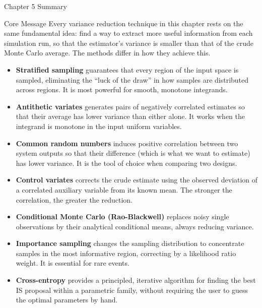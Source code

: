 \documentclass[aspectratio=169,10pt]{beamer}
\begin{document}
\begin{frame}[allowframebreaks]{Chapter 5 Summary}

\begin{block}{Core Message}
  Every variance reduction technique in this chapter rests on the same
  fundamental idea: find a way to extract more useful information from each
  simulation run, so that the estimator's variance is smaller than that of the
  crude Monte Carlo average.  The methods differ in how they achieve this.

  \begin{itemize}
    \item \textbf{Stratified sampling} guarantees that every region of the
          input space is sampled, eliminating the ``luck of the draw'' in how
          samples are distributed across regions.  It is most powerful for smooth,
          monotone integrands.
    \item \textbf{Antithetic variates} generates pairs of negatively correlated
          estimates so that their average has lower variance than either alone.
          It works when the integrand is monotone in the input uniform variables.
    \item \textbf{Common random numbers} induces positive correlation between two
          system outputs so that their difference (which is what we want to
          estimate) has lower variance.  It is the tool of choice when comparing
          two designs.
    \item \textbf{Control variates} corrects the crude estimate using the
          observed deviation of a correlated auxiliary variable from its known
          mean.  The stronger the correlation, the greater the reduction.
    \item \textbf{Conditional Monte Carlo (Rao-Blackwell)} replaces noisy single
          observations by their analytical conditional means, always reducing
          variance.
    \item \textbf{Importance sampling} changes the sampling distribution to
          concentrate samples in the most informative region, correcting by a
          likelihood ratio weight.  It is essential for rare events.
    \item \textbf{Cross-entropy} provides a principled, iterative algorithm for
          finding the best IS proposal within a parametric family, without
          requiring the user to guess the optimal parameters by hand.
  \end{itemize}
\end{block}


\end{frame}
\end{document}
